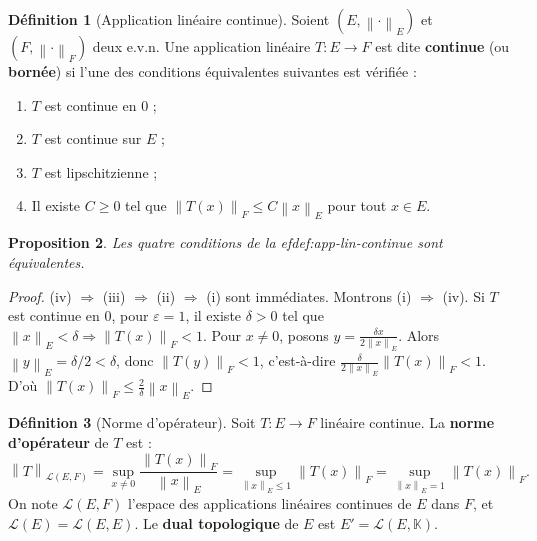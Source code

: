 \documentclass[a4paper,12pt]{book}
\newcommand{\K}{\mathbb{K}}
\newcommand{\norm}[1]{\left\| #1 \right\|}
\theoremstyle{definition}
\newtheorem{definition}{Définition}[chapter]
\theoremstyle{plain}
\newtheorem{proposition}[definition]{Proposition}
\theoremstyle{remark}
\begin{document}
\begin{definition}[Application linéaire continue]\label{def:app-lin-continue}
Soient $(E, \norm{\cdot}_E)$ et $(F, \norm{\cdot}_F)$ deux e.v.n. Une application linéaire $T : E \to F$ est dite \textbf{continue} (ou \textbf{bornée}) si l'une des conditions équivalentes suivantes est vérifiée :
\begin{enumerate}[label=(\roman*)]
    \item $T$ est continue en $0$ ;
    \item $T$ est continue sur $E$ ;
    \item $T$ est lipschitzienne ;
    \item Il existe $C \geq 0$ tel que $\norm{T(x)}_F \leq C \norm{x}_E$ pour tout $x \in E$.
\end{enumerate}
\end{definition}

\begin{proposition}\label{prop:equiv-continuite}
Les quatre conditions de la 
ef{def:app-lin-continue} sont équivalentes.
\end{proposition}

\begin{proof}
(iv) $\Rightarrow$ (iii) $\Rightarrow$ (ii) $\Rightarrow$ (i) sont immédiates. Montrons (i) $\Rightarrow$ (iv). Si $T$ est continue en $0$, pour $\varepsilon = 1$, il existe $\delta > 0$ tel que $\norm{x}_E < \delta \Rightarrow \norm{T(x)}_F < 1$. Pour $x \neq 0$, posons $y = \frac{\delta x}{2\norm{x}_E}$. Alors $\norm{y}_E = \delta/2 < \delta$, donc $\norm{T(y)}_F < 1$, c'est-à-dire $\frac{\delta}{2\norm{x}_E}\norm{T(x)}_F < 1$. D'où $\norm{T(x)}_F \leq \frac{2}{\delta}\norm{x}_E$.
\end{proof}

\begin{definition}[Norme d'opérateur]\label{def:norme-operateur}
Soit $T : E \to F$ linéaire continue. La \textbf{norme d'opérateur} de $T$ est :
\[
    \norm{T}_{\mathcal{L}(E,F)} = \sup_{x \neq 0} \frac{\norm{T(x)}_F}{\norm{x}_E} = \sup_{\norm{x}_E \leq 1} \norm{T(x)}_F = \sup_{\norm{x}_E = 1} \norm{T(x)}_F.
\]
On note $\mathcal{L}(E,F)$ l'espace des applications linéaires continues de $E$ dans $F$, et $\mathcal{L}(E) = \mathcal{L}(E,E)$. Le \textbf{dual topologique} de $E$ est $E' = \mathcal{L}(E, \K)$.
\end{definition}
\end{document}
